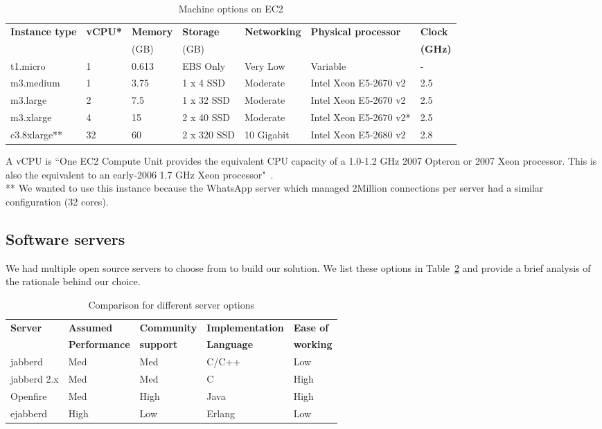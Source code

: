 \documentclass[a4paper, twocolumn]{article}
\begin{document}
\FloatBarrier
\begin{table}
\centering
\begin{tabular}{|l|l|l|l|l|l|l|}
\hline
\bf{Instance type} & \bf{vCPU*} & \bf{Memory} & \bf{Storage} & \bf{Networking} & \bf{Physical processor} & \bf{Clock} \\
&&(GB)&(GB)&&&\bf{(GHz)}\\
\hline
t1.micro & 1 & 0.613 & EBS Only & Very Low & Variable & - \\
m3.medium & 1 & 3.75 & 1 x 4 SSD & Moderate & Intel Xeon E5-2670 v2 & 2.5\\
m3.large & 2 & 7.5 & 1 x 32 SSD & Moderate & Intel Xeon E5-2670 v2 & 2.5\\
m3.xlarge & 4 & 15 & 2 x 40 SSD & Moderate & Intel Xeon E5-2670 v2* & 2.5 \\
c3.8xlarge** & 32 & 60 & 2 x 320 SSD & 10 Gigabit & Intel Xeon E5-2680 v2 & 2.8\\
\hline
\end{tabular}
\caption{\label{tab:machine}Machine options on EC2}
\noindent *A vCPU is ``One EC2 Compute Unit provides the equivalent CPU capacity of a 1.0-1.2 GHz 2007 Opteron or 2007 Xeon processor. This is also the equivalent to an early-2006 1.7 GHz Xeon processor"~\cite{ec2_1}.\\
** We wanted to use this instance because the WhatsApp server which managed 2Million connections per server had a similar configuration (32 cores). 
\end{table}

\subsection{Software servers}
We had multiple open source servers to choose from to build our solution. We list these options in Table~\ref{tab:servers} and provide a brief analysis of the rationale behind our choice. 

\begin{table}
\centering
\begin{tabular}{|l|l|l|l|l|}
\hline
\bf{Server} & \bf{Assumed} & \bf{Community} & \bf{Implementation} & \bf{Ease of}\\
& \bf{Performance}& \bf{support}& \bf{Language}&  \bf{working}\\
\hline
jabberd & Med & Med & C/C++ & Low\\
jabberd 2.x & Med & Med & C & High\\
Openfire & Med & High & Java & High\\
ejabberd & High & Low & Erlang & Low\\
\hline
\end{tabular}
\caption{\label{tab:servers}Comparison for different server options}
\end{table}
\end{document}
